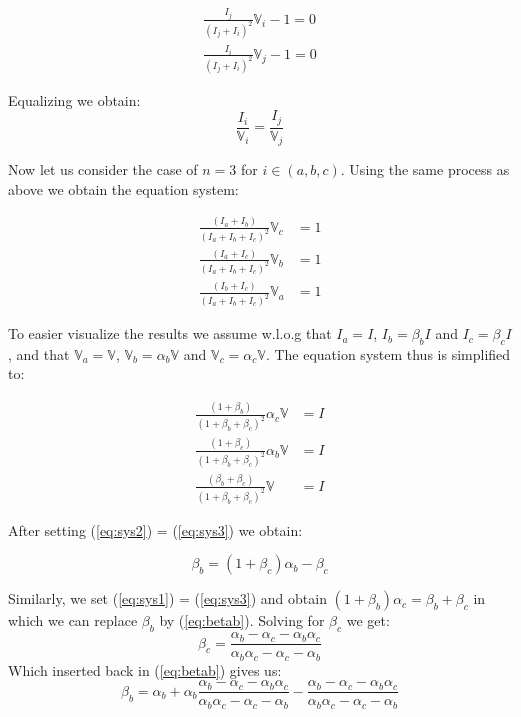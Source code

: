 \begin{equation*}
\begin{split}
    \frac{I_j}{(I_j + I_i)^2}\mathbb{V}_i-1 = 0 \\
    \frac{I_i}{(I_j + I_i)^2}\mathbb{V}_j-1 = 0
\end{split}
\end{equation*}

Equalizing we obtain:
\begin{equation}
    \frac{I_i}{\mathbb{V}_i} = \frac{I_j}{\mathbb{V}_j} 
\end{equation}

Now let us consider the case of $n=3$ for $i \in (a,b,c)$. Using the same process as above we obtain the equation system:

\begin{align}
    \frac{(I_a+I_b)}{(I_a+I_b+I_c)^2}\mathbb{V}_c&=1\\
    \frac{(I_a+I_c)}{(I_a+I_b+I_c)^2}\mathbb{V}_b&=1\\
    \frac{(I_b+I_c)}{(I_a+I_b+I_c)^2}\mathbb{V}_a&=1
\end{align}

To easier visualize the results we assume w.l.o.g that $I_a = I$, $I_b = \beta_b I$ and $ I_c = \beta_c I $, and that $\mathbb{V}_a = \mathbb{V}$, $\mathbb{V}_b = \alpha_b \mathbb{V} $ and $\mathbb{V}_c = \alpha_c \mathbb{V}$. The equation system thus is simplified to:

\begin{align}
    \label{eq:sys1}\frac{(1+\beta_b)}{(1+\beta_b+ \beta_c )^2}\alpha_c\mathbb{V}&=I\\
    \label{eq:sys2}\frac{(1+\beta_c )}{(1+\beta_b  + \beta_c )^2}\alpha_b\mathbb{V}&=I\\
    \label{eq:sys3}\frac{(\beta_b +\beta_c )}{(1+\beta_b  + \beta_c )^2}\mathbb{V}&=I
\end{align}

After setting (\ref{eq:sys2}) = (\ref{eq:sys3}) we obtain:

\begin{equation}
    \label{eq:betab}\beta_b=(1+\beta_c)\alpha_b-\beta_c
\end{equation}

Similarly, we set (\ref{eq:sys1}) = (\ref{eq:sys3}) and obtain $(1+\beta_b)\alpha_c=\beta_b+\beta_c$ in which we can replace $\beta_b$ by (\ref{eq:betab}). Solving for $\beta_c$ we get:
\begin{equation}
\label{eq:betac}
    \beta_c = \frac{\alpha_b-\alpha_c-\alpha_b\alpha_c}{\alpha_b\alpha_c-\alpha_c-\alpha_b}
\end{equation}
Which inserted back in (\ref{eq:betab}) gives us:
\begin{equation}
\label{eq:betab2}
    \beta_b=\alpha_b + \alpha_b\frac{\alpha_b-\alpha_c-\alpha_b\alpha_c}{\alpha_b\alpha_c-\alpha_c-\alpha_b}-\frac{\alpha_b-\alpha_c-\alpha_b\alpha_c}{\alpha_b\alpha_c-\alpha_c-\alpha_b}
\end{equation}

